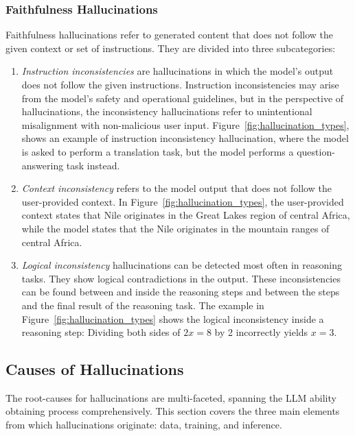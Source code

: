 \documentclass[english, 12pt, a4paper, sci, utf8, a-2b, online]{latex/definitions/aaltothesis}
\begin{document}
\subsubsection{Faithfulness Hallucinations} \label{sec:faithfulness_hallucinations}

Faithfulness hallucinations refer to generated content that does not follow the given context or set of instructions. They are divided into three subcategories:

\begin{enumerate}
    \item \textit{Instruction inconsistencies} are hallucinations in which the model's output does not follow the given instructions. Instruction inconsistencies may arise from the model's safety and operational guidelines, but in the perspective of hallucinations, the inconsistency hallucinations refer to unintentional misalignment with non-malicious user input. Figure~\ref{fig:hallucination_types}, shows an example of instruction inconsistency hallucination, where the model is asked to perform a translation task, but the model performs a question-answering task instead.
    \item \textit{Context inconsistency} refers to the model output that does not follow the user-provided context. In Figure~\ref{fig:hallucination_types}, the user-provided context states that Nile originates in the Great Lakes region of central Africa, while the model states that the Nile originates in the mountain ranges of central Africa.
    \item \textit{Logical inconsistency} hallucinations can be detected most often in reasoning tasks. They show logical contradictions in the output. These inconsistencies can be found between and inside the reasoning steps and between the steps and the final result of the reasoning task. The example in Figure~\ref{fig:hallucination_types} shows the logical inconsistency inside a reasoning step: Dividing both sides of $2x = 8$ by 2 incorrectly yields $x = 3$.
\end{enumerate}

\subsection{Causes of Hallucinations} \label{sec:hallucination_causes}

The root-causes for hallucinations are multi-faceted, spanning the LLM ability obtaining process comprehensively. This section covers the three main elements from which hallucinations originate: data, training, and inference. 
\end{document}
